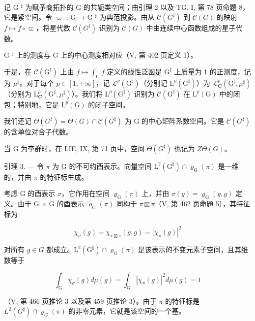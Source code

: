 记 G \(^{\sharp}\) 为赋予商拓扑的 G 的共轭类空间；由引理 2 以及 TG, I, 第 78 页命题 8，它是紧空间。令 \(\varpi\) : G → G \(^{\sharp}\) 为典范投影。由从 \(\mathcal{C}(G^{\sharp})\) 到 \(\mathcal{C}(G)\) 的映射 \(f \mapsto f \circ \varpi\)，将星代数 \(\mathcal{C}(G^{\sharp})\) 识别为 \(\mathcal{C}(G)\) 中由连续中心函数组成的星子代数。

G \(^{\sharp}\) 上的测度与 G 上的中心测度相对应（V, 第 402 页定义 1）。

于是，在 \(\mathcal{C}(\mathrm{G}^{\sharp})\) 上由 \(f\mapsto\int_{\mathrm{G}}f\) 定义的线性泛函是 \(\mathrm{G}^{\sharp}\) 上质量为 1 的正测度，记为 \(\mu^{\sharp}\)。对于每个 \(p\in[1,+\infty]\)，记 \(\mathcal{L}^{p}(\mathrm{G}^{\sharp})\)（分别记 \(\mathrm{L}^{p}(\mathrm{G}^{\sharp})\)）为 \(\mathcal{L}_{\mathbf{C}}^{p}(\mathrm{G}^{\sharp},\mu^{\sharp})\)（分别为 \(\mathrm{L}_{\mathbf{C}}^{p}(\mathrm{G}^{\sharp},\mu^{\sharp})\)）。我们将 \(\mathrm{L}^{p}(\mathrm{G}^{\sharp})\) 识别为 \(\mathcal{C}(\mathrm{G}^{\sharp})\) 在 \(\mathrm{L}^{p}(\mathrm{G})\) 中的闭包；特别地，它是 \(\mathrm{L}^{p}(\mathrm{G})\) 的闭子空间。

我们还记 \(\Theta(G^{\sharp}) = \Theta(G) \cap \mathcal{C}(G^{\sharp})\) 为 G 的中心矩阵系数空间。它是 \(\mathcal{C}(G^{\sharp})\) 的含单位对合子代数。

当 G 为李群时，在 LIE, IX, 第 71 页中，空间 \(\Theta(G^{\sharp})\) 也记为 \(Z\Theta(G)\)。

引理 3. --- 令 \(\pi\) 为 G 的不可约酉表示。向量空间 \(\mathrm{L}^2 (\mathrm{G}^\sharp)\cap \varrho_{\mathrm{G}}(\pi)\) 是一维的，并由 \(\pi\) 的特征标生成。

考虑 G 的酉表示 \(\sigma\)，它作用在空间 \(\varrho_{\mathrm{G}}(\pi)\) 上，并由 \(\sigma(g) = \varrho_{\mathrm{G}}(g, g)\) 定义。由于 G × G 的酉表示 \(\varrho_{\mathrm{G}}(\pi)\) 同构于 \(\overline{\pi} \boxtimes \pi\)（V, 第 462 页命题 5），其特征标为

\[
\chi_ {\sigma} (g) = \chi_ {\overline {{\pi}} \boxtimes \pi} (g, g) = | \chi_ {\pi} (g) | ^ {2}
\]

对所有 \(g \in G\) 都成立。\(\mathrm{L}^2 (\mathrm{G}^\sharp) \cap \varrho_{\mathrm{G}}(\pi)\) 是该表示的不变元素子空间，且其维数等于

\[
\int_ {\mathrm{G}} \chi_ {\sigma} (g) d \mu (g) = \int_ {\mathrm{G}} | \chi_ {\pi} (g) | ^ {2} d \mu (g) = 1
\]

（V, 第 466 页推论 3 以及第 459 页推论 3）。由于 \(\pi\) 的特征标是 \(L^2(G^\sharp) \cap \varrho_G(\pi)\) 的非零元素，它就是该空间的一个基。

